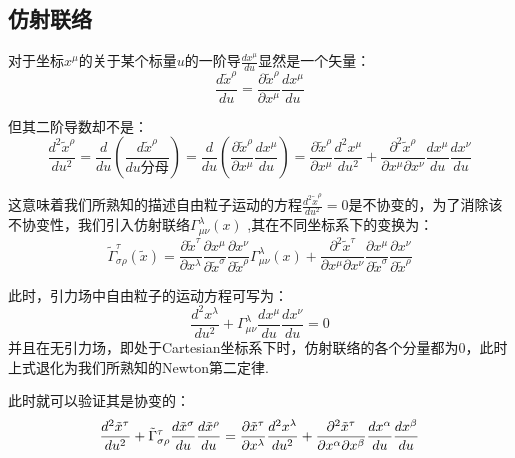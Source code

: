 \documentclass[a4paper]{book}
\begin{document}
\begin{appendix}
\section{仿射联络}
对于坐标$x^{\mu}$的关于某个标量$u$的一阶导$\frac{dx^{\mu}}{du}$显然是一个矢量：
\begin{equation}
	\frac{d\tilde{x}^{\rho}}{du}=\frac{\partial \tilde{x}^{\rho}}{\partial x^{\mu}}\frac{dx^{\mu}}{du}
\end{equation}\par 
但其二阶导数却不是：
\begin{equation}
	\frac{d^2 \tilde{x}^{\rho}}{du^2}=\frac{d}{du}(\frac{d\tilde{x}^{\rho}}{du分母})=\frac{d}{du}(\frac{\partial \tilde{x}^{\rho}}{\partial x^{\mu}}\frac{dx^{\mu}}{du})=\frac{\partial \tilde{x}^{\rho}}{\partial x^{\mu}}\frac{d^2 x^{\mu}}{du^2}+\frac{\partial^2 \tilde{x}^\rho}{\partial x^{\mu} \partial x^{\nu}}\frac{dx^{\mu}}{du}\frac{dx^{\nu}}{du}
\end{equation}\par
这意味着我们所熟知的描述自由粒子运动的方程$\frac{d^2 \tilde{x}^{\rho}}{du^2}=0$是不协变的，为了消除该不协变性，我们引入仿射联络$\Gamma^{\lambda}_{\mu \nu}(x)$
,其在不同坐标系下的变换为：
\begin{equation}
	\tilde{\Gamma}_{\sigma \rho}^{\tau}\left(\tilde{x}\right)=\frac{\partial\tilde{x}^{\tau}}{\partial x^{\lambda}}\frac{\partial x^{\mu}}{\partial\tilde{x}^{\sigma}}\frac{\partial x^{\nu}}{\partial\tilde{x}^{\rho}}\Gamma_{\mu\nu}^{\lambda}\left(x\right)+\frac{\partial^{2}\tilde{x}^{\tau}}{\partial x^{\mu}\partial x^{\nu}} \frac{\partial x^{\mu}}{\partial \tilde{x}^{\sigma}}\frac{\partial x^{\nu}}{\partial \tilde{x}^{\rho}}
\end{equation} \par 
此时，引力场中自由粒子的运动方程可写为：
\begin{equation}\label{A.17}
	\frac{d^2 x^{\lambda}}{du^2}+\Gamma^{\lambda}_{\mu \nu}\frac{dx^{\mu}}{du}\frac{dx^{\nu}}{du}=0
\end{equation}
并且在无引力场，即处于Cartesian坐标系下时，仿射联络的各个分量都为0，此时上式退化为我们所熟知的Newton第二定律. \par 
此时就可以验证其是协变的：
\begin{align}
	\frac{d^2 \tilde{x}^{\tau}}{du^2}+\tilde{\Gamma}^{\tau}_{\sigma \rho}\frac{d\tilde{x}^{\sigma}}{du}\frac{d\tilde{x}^{\rho}}{du}={}& \frac{\partial \tilde{x}^{\tau}}{\partial x^{\lambda}}\frac{d^2   x^{\lambda}}{du^2}+\frac{\partial^2 \tilde{x}^{\tau}}{\partial x^{\alpha}\partial x^{\beta}}\frac{dx^{\alpha}}{du}\frac{dx^{\beta}}{du}\notag \\	

\end{align}
\end{appendix}
\end{document}
